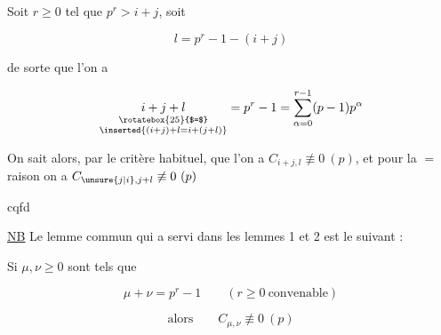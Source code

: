 

Soit $r\geq 0$ tel que $p^r>i+j$, soit 

\[
l=p^r-1-(i+j)
\]

 de sorte que l'on a

\[
\underset{\substack{\rotatebox{25}{$=$}\\\inserted{(i+j)+l=i+(j+l)}}}{i+j+l}=p^r-1=\sum_{\alpha=0}^{r-1}(p-1)p^\alpha
\]

On sait alors, par le critère habituel, que l'on a $C_{i+j,l}\not\equiv 0\ (p)$, et pour la $=$ raison on a $C_{\unsure{j|i},j+l}\not\equiv 0\ (p)$

cqfd

\uline{NB} Le lemme commun qui a servi dans les lemmes 1 et 2 est le suivant :

Si $\mu,\nu\geq 0$ sont tels que

\[
\mu+\nu=p^r-1\qquad (r\geq 0\ \text{convenable})
\]

\[
\text{alors}\qquad C_{\mu,\nu}\not\equiv 0\ (p)
\]


